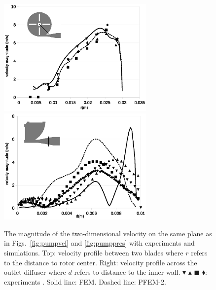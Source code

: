 \begin{figure}[htbp]
    \centering
    \includegraphics[width=3in]{imgs/nozzle_pump/pump_velblade.eps}\\
    \vspace{.5cm}
    \includegraphics[width=3in]{imgs/nozzle_pump/pump_veldiffuser.eps}
    \caption{The magnitude of the two-dimensional velocity on the same plane as in Figs.~\ref{fig:pumpvel} and \ref{fig:pumppres} with experiments and simulations. Top: velocity profile between two blades where $r$ refers to the distance to rotor center. Right: velocity profile across the outlet diffuser where $d$ refers to distance to the inner wall. $\blacktriangledown$ $\blacktriangle$ $\blacksquare$ $\blacklozenge$: experiments \cite{mali_cfd}. Solid line: FEM. Dashed line: PFEM-2. }
    \label{fig:pumpvelprofile}
\end{figure}
